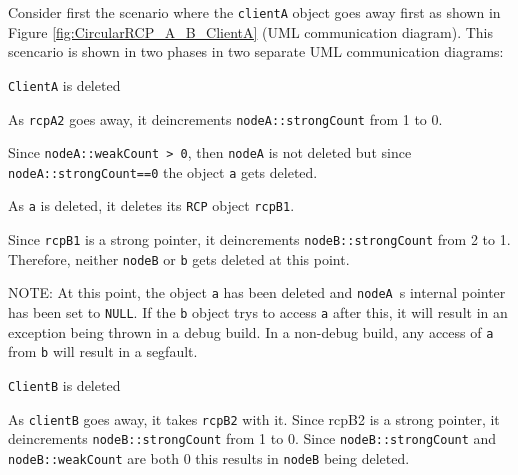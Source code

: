 \documentclass[pdf,ps2pdf,11pt]{SANDreport}
\begin{document}
Consider first the scenario where the {}\texttt{clientA} object goes
away first as shown in Figure {}\ref{fig:CircularRCP_A_B_ClientA} (UML
communication diagram).  This scencario is shown in two phases in two
separate UML communication diagrams:

\begin{description}

{}\item[a)] {}\texttt{ClientA} is deleted

  \begin{description}

  {}\item[a.1)] As {}\texttt{rcpA2} goes away, it deincrements
  {}\texttt{nodeA::strongCount} from 1 to 0.

  {}\item[a.2)] Since {}\texttt{nodeA::weakCount > 0}, then
  {}\texttt{nodeA} is not deleted but since
  {}\texttt{nodeA::strongCount==0} the object {}\texttt{a} gets
  deleted.

  {}\item[a.3)] As {}\texttt{a} is deleted, it deletes its
  {}\texttt{RCP} object {}\texttt{rcpB1}.

  {}\item[a.4)] Since {}\texttt{rcpB1} is a strong pointer, it
  deincrements {}\texttt{nodeB::strongCount} from 2 to 1.  Therefore,
  neither {}\texttt{nodeB} or {}\texttt{b} gets deleted at this point.

  NOTE: At this point, the object {}\texttt{a} has been deleted and
  {}\texttt{nodeA}~s internal pointer has been set to {}\texttt{NULL}.
  If the {}\texttt{b} object trys to access {}\texttt{a} after this,
  it will result in an exception being thrown in a debug build.  In a
  non-debug build, any access of {}\texttt{a} from {}\texttt{b} will
  result in a segfault.

  \end{description}

{}\item[b)] {}\texttt{ClientB} is deleted

  \begin{description}

  {}\item[b.1)] As {}\texttt{clientB} goes away, it takes
  {}\texttt{rcpB2} with it.  Since rcpB2 is a strong pointer, it
  deincrements {}\texttt{nodeB::strongCount} from 1 to 0.  Since
  {}\texttt{nodeB::strongCount} and {}\texttt{nodeB::weakCount} are
  both 0 this results in {}\texttt{nodeB} being deleted.


\end{description}
\end{description}
\end{document}
